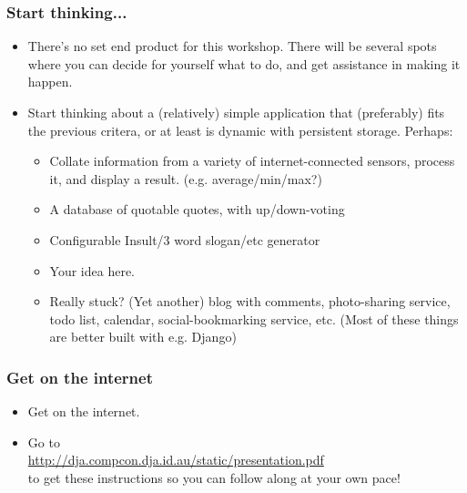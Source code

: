 \documentclass{beamer}
\begin{document}
\begin{frame}
  \frametitle{Start thinking...}
  \begin{itemize}
  \item There's no set end product for this workshop. There will be
    several spots where you can decide for yourself what to do, and
    get assistance in making it happen.

  \item Start thinking about a (relatively) simple application that
    (preferably) fits the previous critera, or at least is dynamic
    with persistent storage. Perhaps:
    \begin{itemize}
    \item Collate information from a variety of internet-connected
      sensors, process it, and display a
      result. (e.g. average/min/max?)
    \item A database of quotable quotes, with up/down-voting
    \item Configurable Insult/3 word slogan/etc
      generator
    \item Your idea here.
    \item Really stuck? (Yet another) blog with comments, photo-sharing service,
      todo list, calendar, social-bookmarking service, etc. (Most of
      these things are better built with e.g. Django)
    \end{itemize}
  \end{itemize}
\end{frame}

\begin{frame}
  \frametitle{Get on the internet}
  \begin{itemize}
  \item Get on the internet.

  \item Go to \\\url{http://dja.compcon.dja.id.au/static/presentation.pdf}\\ to get these instructions so you
    can follow along at your own pace!
  \end{itemize}
\end{frame}
\end{document}
